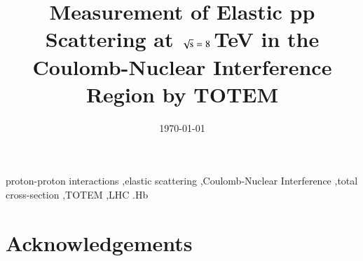 \documentclass[3p,onecolumn,12pt,times,longtitle]{elsarticle}
\begin{document}
\begin{frontmatter}


\title{Measurement of Elastic pp Scattering at $\sqrt{\hbox{s}} = \hbox{8}$\,TeV in the 
Coulomb-Nuclear Interference Region by TOTEM}



\date{\today}

\begin{abstract}

\end{abstract}

\begin{keyword}
proton-proton interactions \sep elastic scattering \sep Coulomb-Nuclear Interference \sep total cross-section \sep TOTEM \sep LHC
.Hb %
\end{keyword}
\end{frontmatter}



\linenumbers















\section*{Acknowledgements}

\end{document}
